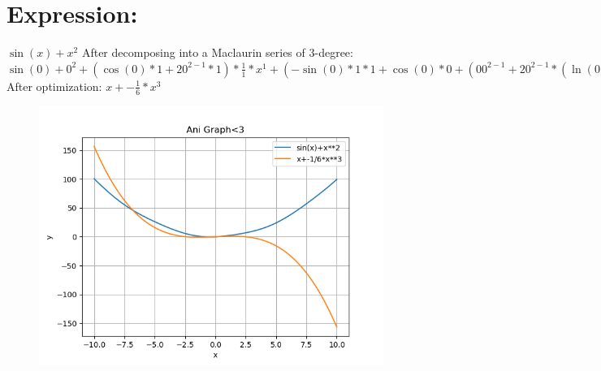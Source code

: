 \documentclass{article}
\begin{document}
\section{Expression:}
$\sin(x)+{x}^{2}$\newline\newline
After decomposing into a Maclaurin series of 3-degree:\newline
$\sin(0)+{0}^{2}+(\cos(0)*1+2{0}^{2-1}*1)*\frac{1}{1}*{x}^{1}+(-\sin(0)*1*1+\cos(0)*0+(0{0}^{2-1}+2{0}^{2-1}*(\ln(0)*(0-0)+\frac{1}{0}*1*(2-1)))*1+2{0}^{2-1}*0)*\frac{1}{2}*{x}^{2}+(((0\sin(0)+-\cos(0)*1)*1+-\sin(0)*0)*1+-\sin(0)*1*0+-\sin(0)*1*0+\cos(0)*0+(0{0}^{2-1}+0{0}^{2-1}*(\ln(0)*(0-0)+\frac{1}{0}*1*(2-1))+0{0}^{2-1}*(\ln(0)*(0-0)+\frac{1}{0}*1*(2-1))+2({0}^{2-1}*(\ln(0)*(0-0)+\frac{1}{0}*1*(2-1))*(\ln(0)*(0-0)+\frac{1}{0}*1*(2-1))+{0}^{2-1}*(\frac{1}{0}*1*(0-0)+\ln(0)*(0-0)+(\frac{00-11}{00}*1+\frac{1}{0}*0)*(2-1)+\frac{1}{0}*1*(0-0))))*1+(0{0}^{2-1}+2{0}^{2-1}*(\ln(0)*(0-0)+\frac{1}{0}*1*(2-1)))*0+(0{0}^{2-1}+2{0}^{2-1}*(\ln(0)*(0-0)+\frac{1}{0}*1*(2-1)))*0+2{0}^{2-1}*0)*\frac{1}{6}*{x}^{3}$\newline\newline
After optimization:\newline
$x+-\frac{1}{6}*{x}^{3}$\newline\newline
\begin{figure} [!ht]
\begin{flushleft}
\includegraphics[scale = 0.700000]{figs/fig3.png}
\end{flushleft}
\end{figure}
\end{document}

